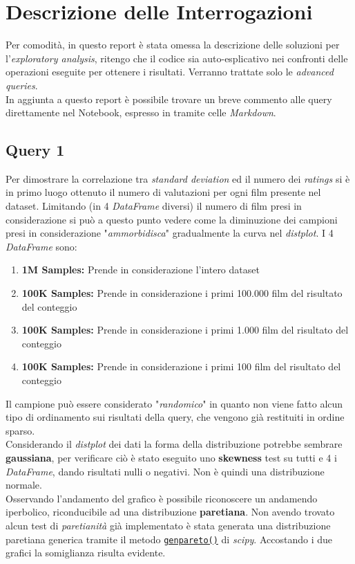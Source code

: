 \documentclass{article}
\begin{document}
    \newpage
    \section{Descrizione delle Interrogazioni}
    Per comodità, in questo report è stata omessa la descrizione delle soluzioni per l'\textit{exploratory analysis}, ritengo che il codice sia auto-esplicativo nei confronti delle operazioni eseguite per ottenere i risultati. Verranno trattate solo le \textit{advanced queries}.\\
    In aggiunta a questo report è possibile trovare un breve commento alle query direttamente nel Notebook, espresso in tramite celle \textit{Markdown}.
    \subsection{Query 1}
        Per dimostrare la correlazione tra \textit{standard deviation} ed il numero dei \textit{ratings} si è in primo luogo ottenuto il numero di valutazioni per ogni film presente nel dataset. Limitando (in 4 \textit{DataFrame} diversi) il numero di film presi in considerazione si può a questo punto vedere come la diminuzione dei campioni presi in considerazione "\textit{ammorbidisca}" gradualmente la curva nel \textit{distplot}. I 4 \textit{DataFrame} sono:
        \begin{enumerate}
            \item \textbf{1M Samples:} Prende in considerazione l'intero dataset
            \item \textbf{100K Samples:} Prende in considerazione i primi 100.000 film del risultato del conteggio
            \item \textbf{100K Samples:} Prende in considerazione i primi 1.000 film del risultato del conteggio
            \item \textbf{100K Samples:} Prende in considerazione i primi 100 film del risultato del conteggio
        \end{enumerate}
        Il campione può essere considerato "\textit{randomico}" in quanto non viene fatto alcun tipo di ordinamento sui risultati della query, che vengono già restituiti in ordine sparso.\\
        Considerando il \textit{distplot} dei dati la forma della distribuzione potrebbe sembrare \textbf{gaussiana}, per verificare ciò è stato eseguito uno \textbf{skewness} test su tutti e 4 i \textit{DataFrame}, dando risultati nulli o negativi. Non è quindi una distribuzione normale.\\
        Osservando l'andamento del grafico è possibile riconoscere un andamendo iperbolico, riconducibile ad una distribuzione \textbf{paretiana}. Non avendo trovato alcun test di \textit{paretianità} già implementato è stata generata una distribuzione paretiana generica tramite il metodo \href{https://docs.scipy.org/doc/scipy/reference/generated/scipy.stats.genpareto.html}{\texttt{genpareto()}} di \textit{scipy}. Accostando i due grafici la somiglianza risulta evidente.
\end{document}
